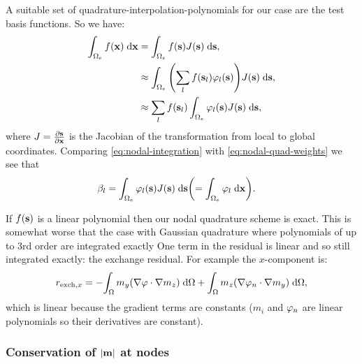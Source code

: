 A suitable set of quadrature-interpolation-polynomials for our case are the test basis functions.
So we have:
\begin{equation}
  \label{eq:nodal-quad-weights}
  \begin{aligned}
    \int_{\Omega_e} f(\mathbf{x}) {\; \mathrm{{d}}} \mathbf{x} &= \int_{\Omega_e} f({\mathbf{s}}) J({\mathbf{s}}) {\; \mathrm{{d}}} {\mathbf{s}}, \\
    &\approx \int_{\Omega_e} {\left( \sum_l f({\mathbf{s}}_l) \varphi_l({\mathbf{s}}) \right)} J({\mathbf{s}}) {\; \mathrm{{d}}} {\mathbf{s}}, \\
    &\approx \sum_l f({\mathbf{s}}_l) \int_{\Omega_e} \varphi_l({\mathbf{s}}) J({\mathbf{s}}) {\; \mathrm{{d}}} {\mathbf{s}},
  \end{aligned} 
\end{equation}
where $J =  \frac{\partial {\mathbf{s}}}{\partial \mathbf{x}}$ is the Jacobian of the transformation from local to global coordinates.
Comparing \cref{eq:nodal-integration} with \cref{eq:nodal-quad-weights} we see that
\begin{equation}
  \begin{aligned}
    \beta_l &= \int_{\Omega_e} \varphi_l({\mathbf{s}}) J({\mathbf{s}}) {\; \mathrm{{d}}} {\mathbf{s}} {\left( = \int_{\Omega_e} \varphi_l {\; \mathrm{{d}}}\mathbf{x} \right)}.
  \end{aligned} 
\end{equation}

If $f({\mathbf{s}})$ is a linear polynomial then our nodal quadrature scheme is exact.
This is somewhat worse that the case with Gaussian quadrature where polynomials of up to 3rd order are integrated exactly
One term in the residual is linear and so still integrated exactly: the exchange residual. For example the $x$-component is:
\begin{equation}
  \begin{aligned}
    r_{\text{exch},x} = - {\int_{\Omega} { m_y {\left( \nabla \varphi \cdot \nabla m_z \right)}} {\; \mathrm{{d}}} {\Omega}} + {\int_{\Omega} { m_z {\left( \nabla \varphi_n \cdot \nabla m_y \right)}} {\; \mathrm{{d}}} {\Omega}},
  \end{aligned}
\end{equation}
which is linear because the gradient terms are constants ($m_i$ and $\varphi_n$ are linear polynomials so their derivatives are constant).


\subsubsection{Conservation of $\left|{\mathbf{m}} \right|$ at nodes}
\label{sec:weak-cons-absmv}

